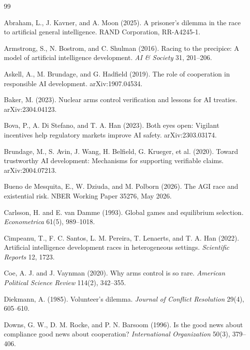 \documentclass[11pt]{article}
\theoremstyle{plain}
\theoremstyle{definition}
\theoremstyle{remark}
\begin{document}
\begin{thebibliography}{99}
\setlength{\itemsep}{2pt}

 Abraham, L., J. Kavner, and A. Moon (2025). A prisoner's dilemma in the race to artificial general intelligence. RAND Corporation, RR-A4245-1.

 Armstrong, S., N. Bostrom, and C. Shulman (2016). Racing to the precipice: A model of artificial intelligence development. \emph{AI \& Society} 31, 201--206.

 Askell, A., M. Brundage, and G. Hadfield (2019). The role of cooperation in responsible AI development. arXiv:1907.04534.

 Baker, M. (2023). Nuclear arms control verification and lessons for AI treaties. arXiv:2304.04123.

 Bova, P., A. Di Stefano, and T. A. Han (2023). Both eyes open: Vigilant incentives help regulatory markets improve AI safety. arXiv:2303.03174.

 Brundage, M., S. Avin, J. Wang, H. Belfield, G. Krueger, et al. (2020). Toward trustworthy AI development: Mechanisms for supporting verifiable claims. arXiv:2004.07213.

 Bueno de Mesquita, E., W. Dziuda, and M. Polborn (2026). The AGI race and existential risk. NBER Working Paper 35276, May 2026.

 Carlsson, H. and E. van Damme (1993). Global games and equilibrium selection. \emph{Econometrica} 61(5), 989--1018.

 Cimpeanu, T., F. C. Santos, L. M. Pereira, T. Lenaerts, and T. A. Han (2022). Artificial intelligence development races in heterogeneous settings. \emph{Scientific Reports} 12, 1723.

 Coe, A. J. and J. Vaynman (2020). Why arms control is so rare. \emph{American Political Science Review} 114(2), 342--355.

 Diekmann, A. (1985). Volunteer's dilemma. \emph{Journal of Conflict Resolution} 29(4), 605--610.

 Downs, G. W., D. M. Rocke, and P. N. Barsoom (1996). Is the good news about compliance good news about cooperation? \emph{International Organization} 50(3), 379--406.


\end{thebibliography}
\end{document}
